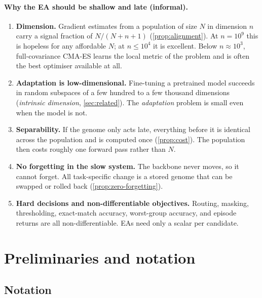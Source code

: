 \documentclass[11pt,a4paper]{article}
\theoremstyle{definition}
\theoremstyle{plain}
\theoremstyle{remark}
\begin{document}
\paragraph{Why the EA should be shallow and late (informal).}
\begin{enumerate}[label=(\alph*)]
\item \textbf{Dimension.} Gradient estimates from a population of size $N$ in dimension $n$ carry a signal fraction of $N/(N+n+1)$ (\cref{prop:alignment}). At $n = 10^9$ this is hopeless for any affordable $N$; at $n \le 10^4$ it is excellent. Below $n\approx 10^3$, full-covariance CMA-ES learns the local metric of the problem and is often the best optimiser available at all.
\item \textbf{Adaptation is low-dimensional.} Fine-tuning a pretrained model succeeds in random subspaces of a few hundred to a few thousand dimensions (\emph{intrinsic dimension}, \cref{sec:related}). The \emph{adaptation} problem is small even when the model is not.
\item \textbf{Separability.} If the genome only acts late, everything before it is identical across the population and is computed once (\cref{prop:cost}). The population then costs roughly one forward pass rather than $N$.
\item \textbf{No forgetting in the slow system.} The backbone never moves, so it cannot forget. All task-specific change is a stored genome that can be swapped or rolled back (\cref{prop:zero-forgetting}).
\item \textbf{Hard decisions and non-differentiable objectives.} Routing, masking, thresholding, exact-match accuracy, worst-group accuracy, and episode returns are all non-differentiable. EAs need only a scalar per candidate.
\end{enumerate}

\section{Preliminaries and notation}
\label{sec:prelim}

\subsection{Notation}
\end{document}
